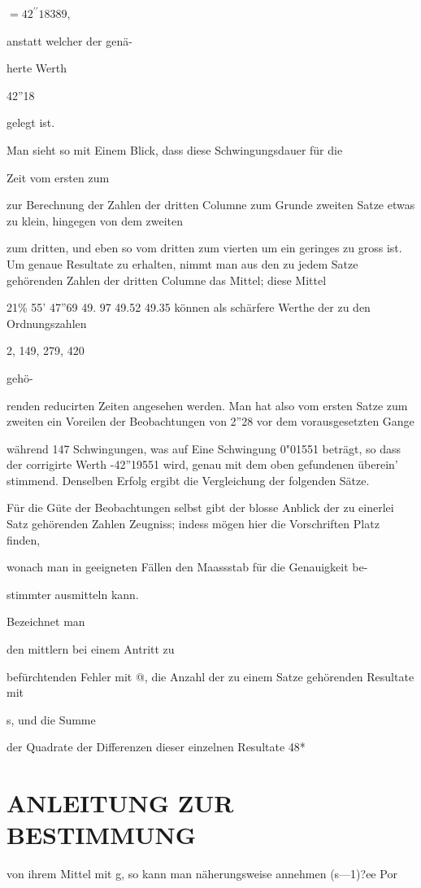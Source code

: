 \documentclass[12pt,a4paper]{article}
\begin{document}
$= 42^{\prime\prime}18389,$

anstatt welcher der genä-

herte Werth

42”18

gelegt ist.

Man sieht so mit Einem Blick, dass diese Schwingungsdauer für die

Zeit vom ersten zum

zur Berechnung der Zahlen der dritten Columne zum Grunde zweiten Satze etwas zu klein, hingegen von dem zweiten

zum dritten, und eben so vom dritten zum vierten um ein geringes zu gross ist. Um genaue Resultate zu erhalten, nimmt man aus den zu jedem Satze gehörenden Zahlen der dritten Columne das Mittel; diese Mittel

21\% 55’ 47”69 49. 97 49.52 49.35 können als schärfere Werthe der zu den Ordnungszahlen

2, 149, 279, 420

gehö-

renden reducirten Zeiten angesehen werden. Man hat also vom ersten Satze zum zweiten ein Voreilen der Beobachtungen von 2”28 vor dem vorausgesetzten Gange

während 147 Schwingungen, was auf Eine Schwingung 0"01551 beträgt, so dass der corrigirte Werth -42”19551 wird, genau mit dem oben gefundenen überein' stimmend. Denselben Erfolg ergibt die Vergleichung der folgenden Sätze.

Für die Güte der Beobachtungen selbst gibt der blosse Anblick der zu einerlei Satz gehörenden Zahlen Zeugniss; indess mögen hier die Vorschriften Platz finden,

wonach man in geeigneten Fällen den Maassstab für die Genauigkeit be-

stimmter ausmitteln kann.

Bezeichnet man

den mittlern bei einem Antritt zu

befürchtenden Fehler mit @, die Anzahl der zu einem Satze gehörenden Resultate mit

s, und die Summe

der Quadrate der Differenzen dieser einzelnen Resultate 48*

\section*{ANLEITUNG ZUR BESTIMMUNG}
von ihrem Mittel mit g, so kann man näherungsweise annehmen (s—1)?ee Por
\end{document}
